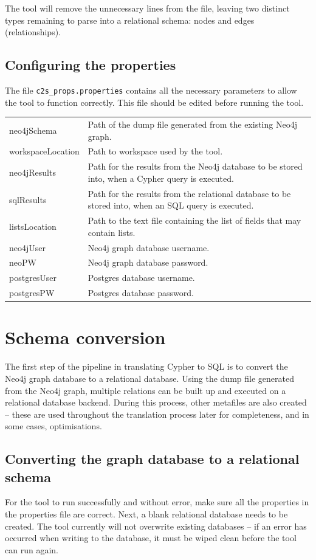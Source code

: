 \documentclass[letterpaper]{ltxdoc}
\begin{document}
The tool will remove the unnecessary lines from the file, leaving two distinct types remaining to parse into a relational schema: nodes and edges (relationships).


\subsection{Configuring the properties}
\label{ss:prop}
The file \texttt{c2s\_props.properties} contains all the necessary parameters to allow the tool to function correctly. This file should be edited before running the tool.

\begin{center}
\begin{tabular}{ p{3cm} p{10.5cm} }
neo4jSchema & Path of the dump file generated from the existing Neo4j graph. \\
workspaceLocation & Path to workspace used by the tool. \\
neo4jResults & Path for the results from the Neo4j database to be stored into, when a Cypher query is executed. \\
sqlResults & Path for the results from the relational database to be stored into, when an SQL query is executed. \\
listsLocation & Path to the text file containing the list of fields that may contain lists. \\
neo4jUser & Neo4j graph database username. \\
neoPW & Neo4j graph database password. \\
postgresUser & Postgres database username. \\
postgresPW & Postgres database password. \\
\end{tabular}
\end{center}


\section{Schema conversion}
\label{sec:schemaConv}
The first step of the pipeline in translating Cypher to SQL is to convert the Neo4j graph database to a relational database. Using the dump file generated from the Neo4j graph, multiple relations can be built up and executed on a relational database backend. During this process, other metafiles are also created -- these are used throughout the translation process later for completeness, and in some cases, optimisations.


\subsection{Converting the graph database to a relational schema}
For the tool to run successfully and without error, make sure all the properties in the properties file are correct. Next, a blank relational database needs to be created. The tool currently will not overwrite existing databases -- if an error has occurred when writing to the database, it must be wiped clean before the tool can run again.
\end{document}
